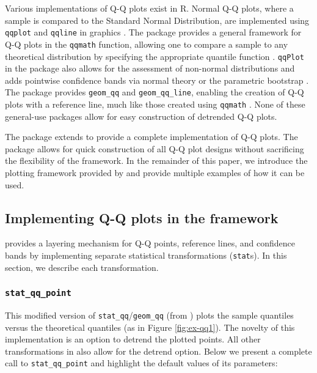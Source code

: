 Various implementations of Q-Q plots exist in R. Normal Q-Q plots, where
a sample is compared to the Standard Normal Distribution, are
implemented using \texttt{qqplot} and \texttt{qqline} in 
graphics \citep{R}. The  package provides a general
framework for Q-Q plots in the \texttt{qqmath} function, allowing one to
compare a sample to any theoretical distribution by specifying the
appropriate quantile function \citep{lattice}. \texttt{qqPlot} in the
 package also allows for the assessment of non-normal
distributions and adds pointwise confidence bands via normal theory or
the parametric bootstrap \citep{car}. The  package provides
\texttt{geom\_qq} and \texttt{geom\_qq\_line}, enabling the creation of
Q-Q plots with a reference line, much like those created using
\texttt{qqmath} \citep{ggplot2}. None of these general-use packages
allow for easy construction of detrended Q-Q plots.

The  package extends  to provide a complete
implementation of Q-Q plots. The package allows for quick construction
of all Q-Q plot designs without sacrificing the flexibility of the
 framework. In the remainder of this paper, we introduce
the plotting framework provided by  and provide multiple
examples of how it can be used.

\subsection{\texorpdfstring{Implementing Q-Q plots in the 
framework}{Implementing Q-Q plots in the  framework}}\label{implementing-q-q-plots-in-the-framework}

\label{sec:implementing}

 provides a  layering mechanism for Q-Q
points, reference lines, and confidence bands by implementing separate
statistical transformations (\texttt{stat}s). In this section, we
describe each transformation.

\subsubsection{\texorpdfstring{\texttt{stat\_qq\_point}}{stat\_qq\_point}}\label{stat_qq_point}

This modified version of \texttt{stat\_qq}/\texttt{geom\_qq} (from
) plots the sample quantiles versus the theoretical
quantiles (as in Figure \ref{fig:ex-qq1}). The novelty of this
implementation is an option to detrend the plotted points. All other
transformations in  also allow for the detrend option.
Below we present a complete call to \texttt{stat\_qq\_point} and
highlight the default values of its parameters:

